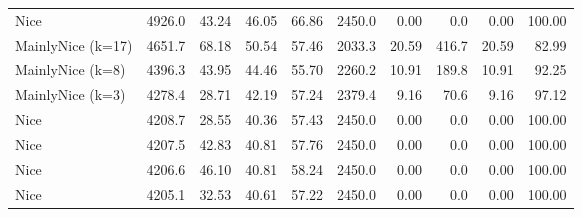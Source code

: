 \documentclass[journal,a4paper,10pt,twoside]{IEEEtran} %
\begin{document}
\begin{table}[ht]
\begin{tabular}{l|rrrr|rrrrr}
		Nice              & 4926.0 & 43.24 &     46.05 &    66.86 & 2450.0 &                   0.00 &    0.0 &                    0.00 & 100.00 \\
		MainlyNice (k=17) & 4651.7 & 68.18 &     50.54 &    57.46 & 2033.3 &                  20.59 &  416.7 &                   20.59 &  82.99 \\
		MainlyNice (k=8)  & 4396.3 & 43.95 &     44.46 &    55.70 & 2260.2 &                  10.91 &  189.8 &                   10.91 &  92.25 \\
		MainlyNice (k=3)  & 4278.4 & 28.71 &     42.19 &    57.24 & 2379.4 &                   9.16 &   70.6 &                    9.16 &  97.12 \\
		Nice              & 4208.7 & 28.55 &     40.36 &    57.43 & 2450.0 &                   0.00 &    0.0 &                    0.00 & 100.00 \\
		Nice              & 4207.5 & 42.83 &     40.81 &    57.76 & 2450.0 &                   0.00 &    0.0 &                    0.00 & 100.00 \\
		Nice              & 4206.6 & 46.10 &     40.81 &    58.24 & 2450.0 &                   0.00 &    0.0 &                    0.00 & 100.00 \\
		Nice              & 4205.1 & 32.53 &     40.61 &    57.22 & 2450.0 &                   0.00 &    0.0 &                    0.00 & 100.00 \\ \bottomrule
	\end{tabular}
\end{table}
\end{document}
